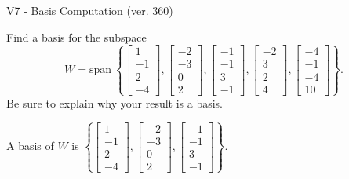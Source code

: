 \begin{exercise}
  \begin{exerciseTitle}V7 - Basis Computation (ver. 360)\end{exerciseTitle}
  \begin{exerciseStatement}
    Find a basis for the subspace 
\[W=\mathrm{span}\ \left\{\left[\begin{array}{r}
1 \\
-1 \\
2 \\
-4
\end{array}\right] , \left[\begin{array}{r}
-2 \\
-3 \\
0 \\
2
\end{array}\right] , \left[\begin{array}{r}
-1 \\
-1 \\
3 \\
-1
\end{array}\right] , \left[\begin{array}{r}
-2 \\
3 \\
2 \\
4
\end{array}\right] , \left[\begin{array}{r}
-4 \\
-1 \\
-4 \\
10
\end{array}\right]\right\}.\]
 Be sure to explain why your result is a basis.


  \end{exerciseStatement}
  \begin{exerciseAnswer}
   A basis of \(W\) is  \(\left\{\left[\begin{array}{r}
1 \\
-1 \\
2 \\
-4
\end{array}\right] , \left[\begin{array}{r}
-2 \\
-3 \\
0 \\
2
\end{array}\right] , \left[\begin{array}{r}
-1 \\
-1 \\
3 \\
-1
\end{array}\right]\right\}\).
  


  \end{exerciseAnswer}
\end{exercise}